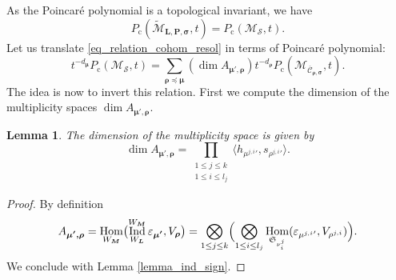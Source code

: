 \documentclass[11pt]{article}
\newcommand{\rc}{\mathrm{c}}
\newcommand{\blangle}{\bigl\langle}
\newcommand{\brangle}{\bigr\rangle}
\let\epsilon\varepsilon
\theoremstyle{definition}
\theoremstyle{plain}
\newtheorem{lemma}[definition]{Lemma}
\DeclareMathOperator{\Hom}{Hom}
\DeclareMathOperator{\Ind}{Ind}
\newcommand{\Sym}{\mathfrak{S}}
\newcommand{\mlps}{\widetilde{\mathcal{M}}_{\boldsymbol{L},\boldsymbol{P},\boldsymbol{\sigma}}}
\begin{document}
As the Poincaré polynomial is a topological invariant, we have
\[
P_{\rc}(\mlps,t) = P_{\rc}(\mathcal{M}_{\boldsymbol{\mathcal{S}}},t).
\]
Let us translate \eqref{eq_relation_cohom_resol} in terms of Poincaré polynomial:
\begin{equation}\label{eq_combi_ss_resol}
t^{-d_{\boldsymbol{\mu}}} P_{\rc}\left(\mathcal{M}_{\boldsymbol{\mathcal{S}}},t\right) = \sum_{\boldsymbol{\rho\preceq\mu}}(\dim A_{\boldsymbol{\mu',\rho}}) t^{-d_{\boldsymbol{\rho}}} P_{\rc}(\mathcal{M}_{\overline{\mathcal{C}}_{\boldsymbol{\rho},\boldsymbol{\sigma}}}, t).
\end{equation}
The idea is now to invert this relation. First we compute the dimension of the multiplicity spaces $\dim A_{\boldsymbol{\mu',\rho}}$.
\begin{lemma}\label{lemma_dim_Amurho}
The dimension of the multiplicity space is given by
\[
\dim A_{\boldsymbol{\mu',\rho}} = \prod_{\substack{ 1\le j \le k \\ 1 \le i \le l_j }}\blangle h_{{\mu^{j,i}}'}, s_{ {\rho^{j,i}}' }\brangle.
\]
\end{lemma}
\begin{proof}
By definition
\[
A_{\boldsymbol{\mu',\rho}} = \Hom_{W_{\boldsymbol{M}}}
\bigl(\Ind_{W_{\boldsymbol{L}}}^{W_{\boldsymbol{M}}} \epsilon_{\boldsymbol{\mu'}}, V_{\boldsymbol{\rho}}\bigr)= \bigotimes_{1 \le j \le k} \Bigl(\bigotimes_{1 \le i \le l_j}\Hom_{\Sym_{\nu^j_i}}(\epsilon_{{\mu^{ j,i }}' },V_{\rho^{ j,i }}) \Bigr).
\]
We conclude with Lemma \ref{lemma_ind_sign}.
\end{proof}
\end{document}
